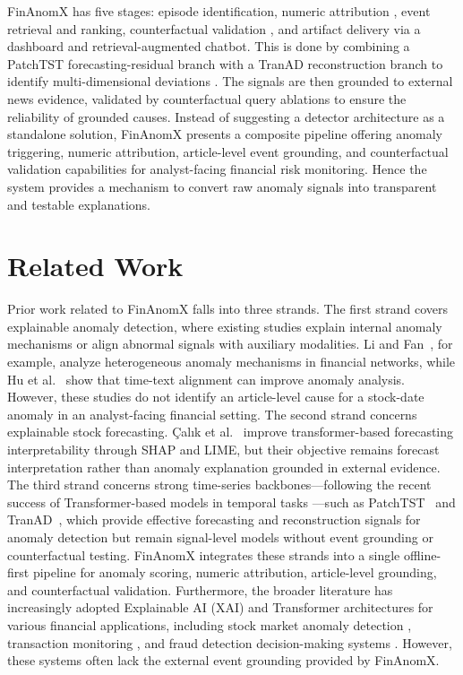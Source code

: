 \documentclass[11pt,a4paper,twoside]{article}
\begin{document}
FinAnomX has five stages: episode identification, numeric attribution \cite{arrieta2020}, event retrieval and ranking, counterfactual validation \cite{verma2020, wachter2017}, and artifact delivery via a dashboard and retrieval-augmented chatbot. This is done by combining a PatchTST forecasting-residual branch with a TranAD reconstruction branch to identify multi-dimensional deviations \cite{nie2023, tuli2022}. The signals are then grounded to external news evidence, validated by counterfactual query ablations to ensure the reliability of grounded causes. Instead of suggesting a detector architecture as a standalone solution, FinAnomX presents a composite pipeline offering anomaly triggering, numeric attribution, article-level event grounding, and counterfactual validation capabilities for analyst-facing financial risk monitoring. Hence the system provides a mechanism to convert raw anomaly signals into transparent and testable explanations.

\section{Related Work}

Prior work related to FinAnomX falls into three strands. The first strand covers explainable anomaly detection, where existing studies explain internal anomaly mechanisms or align abnormal signals with auxiliary modalities. Li and Fan~\cite{li2025}, for example, analyze heterogeneous anomaly mechanisms in financial networks, while Hu et al.~\cite{hu2026} show that time-text alignment can improve anomaly analysis. However, these studies do not identify an article-level cause for a stock-date anomaly in an analyst-facing financial setting. The second strand concerns explainable stock forecasting. \c{C}alık et al.~\cite{calik2025} improve transformer-based forecasting interpretability through SHAP and LIME, but their objective remains forecast interpretation rather than anomaly explanation grounded in external evidence. The third strand concerns strong time-series backbones---following the recent success of Transformer-based models in temporal tasks \cite{zeng2023, liu2024}---such as PatchTST~\cite{nie2023} and TranAD~\cite{tuli2022}, which provide effective forecasting and reconstruction signals for anomaly detection but remain signal-level models without event grounding or counterfactual testing. FinAnomX integrates these strands into a single offline-first pipeline for anomaly scoring, numeric attribution, article-level grounding, and counterfactual validation. Furthermore, the broader literature has increasingly adopted Explainable AI (XAI) and Transformer architectures for various financial applications, including stock market anomaly detection \cite{siahmaki2023}, transaction monitoring \cite{bhattacharyya2024}, and fraud detection decision-making systems \cite{luo2025, jin2025}. However, these systems often lack the external event grounding provided by FinAnomX.
\end{document}
